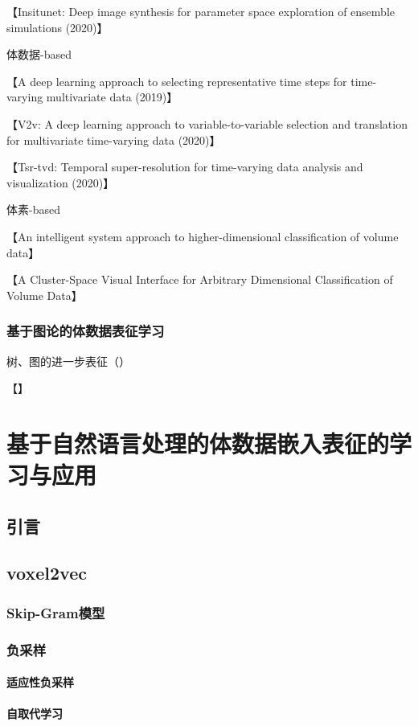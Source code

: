 【Insitunet: Deep image synthesis for parameter space exploration of ensemble simulations (2020)】

体数据-based

【A deep learning approach to selecting representative time steps for time-varying multivariate data (2019)】

【V2v: A deep learning approach to variable-to-variable selection and translation for multivariate time-varying data (2020)】

【Tsr-tvd: Temporal super-resolution for time-varying data analysis and visualization (2020)】

体素-based

【An intelligent system approach to higher-dimensional classification of volume data】

【A Cluster-Space Visual Interface for Arbitrary Dimensional Classification of Volume Data】


\subsection{基于图论的体数据表征学习}

树、图的进一步表征（）

【】


\chapter{基于自然语言处理的体数据嵌入表征的学习与应用}

\section{引言}

\section{voxel2vec}
\subsection{Skip-Gram模型}
\subsection{负采样}
\subsubsection{适应性负采样}
\subsubsection{自取代学习}
